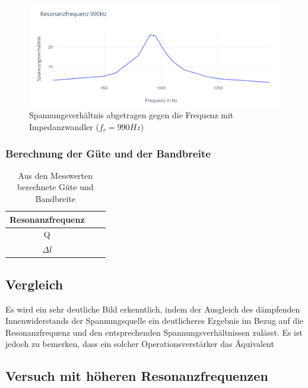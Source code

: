 \documentclass{article}
\begin{document}
\begin{figure}[h]
  \begin{center}
    \includegraphics[scale=0.75]{../assets/images/ETP3/Fre990Plot5.PNG}
    \caption{Spannungsverhältnis abgetragen gegen die Frequenz mit Impedanzwandler ($f_r = 990Hz$)}
  \end{center}
\end{figure}


\subsubsection{Berechnung der Güte und der Bandbreite}

\begin{table}[h!]
  \begin{center}
    \begin{tabular}{|c|c|c|}
      \hline
      Resonanzfrequenz &  & \\
      \hline
      Q                &  & \\
      \hline
      $\Delta$f        &  & \\
      \hline
    \end{tabular}
    \caption{Aus den Messwerten berechnete Güte und Bandbreite}
    \label{tab:zMGB}
  \end{center}
\end{table}

\subsection{Vergleich}

Es wird ein sehr deutliche Bild erkenntlich, indem der Ausgleich des dämpfenden Innenwiderstands der
Spannungsquelle ein deutlicheres Ergebnis im Bezug auf die Resonanzfrequenz und den entsprechenden Spannungsverhältnissen zulässt.
Es ist jedoch zu bemerken, dass ein solcher Operationsverstärker das Äquivalent


\subsection{Versuch mit höheren Resonanzfrequenzen}
\end{document}
